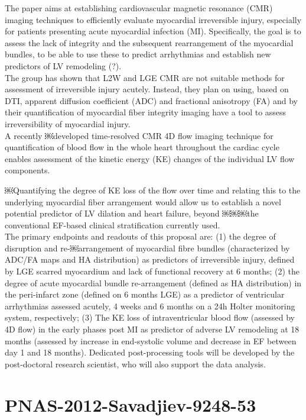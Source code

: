 The paper aims at establishing cardiovascular magnetic resonance (CMR) imaging techniques to efficiently evaluate myocardial irreversible injury, especially for patients presenting acute myocardial infection (MI).
Specifically, the goal is to assess the lack of integrity and the subsequent rearrangement of the myocardial bundles, to be able to use these to predict arrhythmias and establish new predictors of LV remodeling (?).\\
The group has shown that L2W and LGE CMR are not suitable methods for assessment of irreversible injury acutely. Instead, they plan on using, based on DTI, apparent diffusion coefficient (ADC) and fractional anisotropy (FA) and by their quantification of myocardial fiber integrity imaging have a tool to assess irreversibility of myocardial injury.\\

A recently ￼developed time-resolved CMR 4D flow imaging technique for quantification of blood flow in the whole heart throughout the cardiac
cycle enables assessment of the kinetic energy (KE) changes of the individual LV flow components.

￼Quantifying the degree of KE loss of the flow over time and relating this to the underlying myocardial fiber arrangement would allow us to establish a novel potential predictor of LV dilation and heart failure, beyond
￼￼￼the conventional EF-based clinical stratification currently used.\\

The primary endpoints and readouts of this proposal are: (1) the degree of disruption and re-￼arrangement of myocardial fibre bundles (characterized by ADC/FA maps and HA distribution) as predictors of irreversible injury, defined by LGE scarred myocardium and lack of functional recovery at 6 months; (2) the degree of acute myocardial bundle re-arrangement (defined as HA distribution) in the peri-infarct zone (defined on 6 months LGE) as a predictor of ventricular arrhythmias assessed acutely, 4 weeks and 6 months on a 24h Holter monitoring system, respectively; (3) The KE loss of intraventricular blood flow (assessed by 4D flow) in the early phases post MI as predictor of adverse LV remodeling at 18 months (assessed by increase in end-systolic volume and decrease in EF between day 1 and 18 months). Dedicated post-processing tools will be developed by the post-doctoral research scientist, who will also
support the data analysis.

\section{PNAS-2012-Savadjiev-9248-53}

